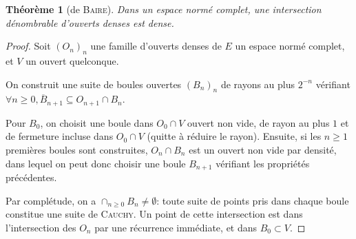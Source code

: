 \documentclass[a4paper]{article}
\newcommand{\oB}{\overline{B}}
\newtheorem*{thm*}{Théorème}
\theoremstyle{definition}
\begin{document}
\begin{thm*}[de \textsc{Baire}]
	Dans un espace normé complet, une intersection dénombrable d'ouverts denses est dense.
\end{thm*}
\begin{proof}
	Soit $(O_n)_n$ une famille d'ouverts denses de $E$ un espace normé complet, et $V$ un ouvert quelconque.

	On construit une suite de boules ouvertes $(B_n)_n$ de rayons au plus $2^{-n}$ vérifiant $\forall n\geq0, \oB_{n+1} \subseteq O_{n+1}\cap B_n$.

	Pour $B_0$, on choisit une boule dans $O_0 \cap V$ ouvert non vide, de rayon au plus $1$ et de fermeture incluse dans $O_0 \cap V$ (quitte à réduire le rayon).
	Ensuite, si les $n\geq1$ premières boules sont construites, $O_{n} \cap B_n$ est un ouvert non vide par densité, dans lequel on peut donc choisir une boule $B_{n+1}$ vérifiant les propriétés précédentes.

	Par complétude, on a $\cap_{n\geq0} B_n \neq \emptyset$: toute suite de points pris dans chaque boule constitue une suite de \textsc{Cauchy}.
	Un point de cette intersection est dans l'intersection des $O_n$ par une récurrence immédiate, et dans $B_0 \subset V$.
\end{proof}
\end{document}
